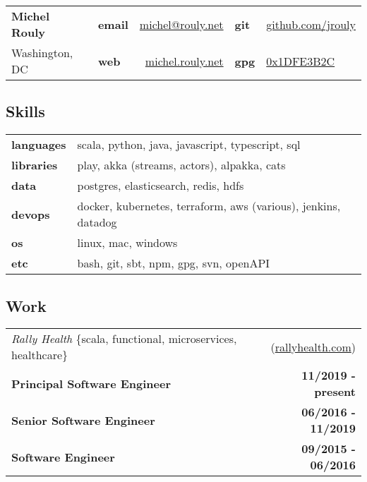\documentclass[10pt,letterpaper]{article}
\begin{document}
\setcounter{secnumdepth}{0}

\noindent
\begin{tabularx}{\textwidth}{@{} l X lr lX @{}}
  {\Large\textbf{Michel Rouly}} & &
      \textbf{email} & \href{mailto:michel@rouly.net}{michel@rouly.net} &
      \textbf{git} & \href{https://github.com/jrouly}{github.com/jrouly} \\
  {Washington, DC} & &
      \textbf{web} & \href{https://michel.rouly.net}{michel.rouly.net} &
      \textbf{gpg} & \href{http://keys.gnupg.net/pks/lookup?op=get\&search=0x68E925EE1DFE3B2C}{0x1DFE3B2C} \\
\end{tabularx}

\subsection{Skills}

\noindent
\begin{tabularx}{\textwidth}{@{} lX @{}}
  \textbf{languages} & scala, python, java, javascript, typescript, sql \\
  \textbf{libraries} & play, akka (streams, actors), alpakka, cats \\
  \textbf{data} & postgres, elasticsearch, redis, hdfs \\
  \textbf{devops} & docker, kubernetes, terraform, aws (various), jenkins, datadog \\
  \textbf{os} & linux, mac, windows \\
  \textbf{etc} & bash, git, sbt, npm, gpg, svn, openAPI
\end{tabularx}

\subsection{Work}

\noindent\begin{tabularx}{\textwidth}{@{} Xr @{}}
  \textit{Rally Health} \{scala, functional, microservices, healthcare\} & (\href{https://www.rallyhealth.com}{rallyhealth.com}) \\
  \textbf{Principal Software Engineer} & \textbf{11/2019 - present} \\
  \textbf{Senior Software Engineer} & \textbf{06/2016 - 11/2019} \\
  \textbf{Software Engineer} & \textbf{09/2015 - 06/2016} \\
\end{tabularx}
\end{document}
